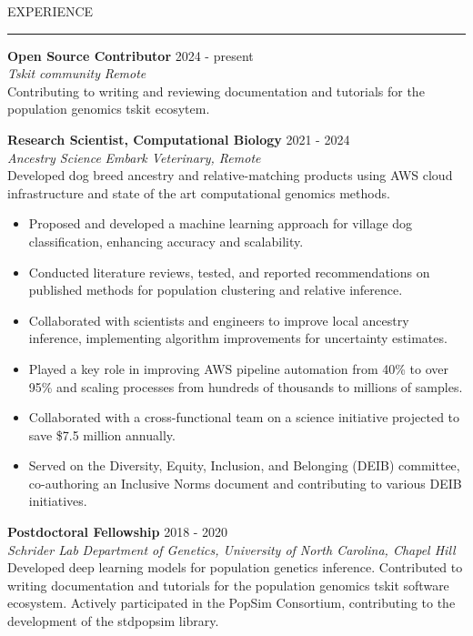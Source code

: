 \documentclass{resume} %
\renewenvironment{rSection}[1]{
\sectionskip
\textcolor{RoyalPurple}{\MakeUppercase{#1}}
\sectionlineskip
\hrule
\begin{list}{}{
\setlength{\leftmargin}{1.5em}
}
\item[]
}{
\end{list}
}
\begin{document}
\begin{rSection}{Experience}

{\bf Open Source Contributor} \hfill  2024 - present\\ 
{\em Tskit community} \hfill {\em Remote}\\
Contributing to writing and reviewing documentation and tutorials for the population genomics tskit ecosytem.

{\bf Research Scientist, Computational Biology} \hfill  2021 - 2024\\ 
{\em Ancestry Science} \hfill {\em Embark Veterinary, Remote}\\
Developed dog breed ancestry and relative-matching products using AWS cloud infrastructure and state of the art computational genomics methods.
\begin{itemize}[noitemsep, topsep=0pt]
    \item Proposed and developed a machine learning approach for village dog classification, enhancing accuracy and scalability.
    \item Conducted literature reviews, tested, and reported recommendations on published methods for population clustering and relative inference.
    \item Collaborated with scientists and engineers to improve local ancestry inference, implementing algorithm improvements for uncertainty estimates.
    \item Played a key role in improving AWS pipeline automation from 40\% to over 95\% and scaling processes from hundreds of thousands to millions of samples.
    \item Collaborated with a cross-functional team on a science initiative projected to save \$7.5 million annually. 
    \item Served on the Diversity, Equity, Inclusion, and Belonging (DEIB) committee, co-authoring an Inclusive Norms document and contributing to various DEIB initiatives.
\end{itemize}

{\bf Postdoctoral Fellowship} \hfill  2018 - 2020\\ 
{\em Schrider Lab} \hfill {\em Department of Genetics, University of North Carolina, Chapel Hill}\\
Developed deep learning models for population genetics inference. Contributed to writing documentation and tutorials for the population genomics tskit software ecosystem. Actively participated in the PopSim Consortium, contributing to the development of the stdpopsim library.



\end{rSection}
\end{document}
